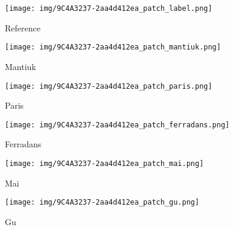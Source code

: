 \documentclass[journal]{IEEEtran}
\begin{document}
\begin{figure*}[t]
        \centering
        \begin{subfigure}[b]{0.24\textwidth}  
            \centering 
            \texttt{[image: img/9C4A3237-2aa4d412ea\_patch\_label.png]}
            \caption[]%
            {{\small Reference }}    
            \label{fig:mean and std of net24}
        \end{subfigure}
        \begin{subfigure}[b]{0.24\textwidth}  
            \centering 
            \texttt{[image: img/9C4A3237-2aa4d412ea\_patch\_mantiuk.png]}
            \caption[]%
            {{\small Mantiuk \cite{mantiuk2008display} }}    
            \label{fig:mean and std of net24}
        \end{subfigure}
        \begin{subfigure}[b]{0.24\textwidth}   
            \centering 
            \texttt{[image: img/9C4A3237-2aa4d412ea\_patch\_paris.png]}
            \caption[]%
            {{\small Paris \cite{paris2015local} }}    
            \label{fig:mean and std of net34}
        \end{subfigure}
        \begin{subfigure}[b]{0.24\textwidth}   
            \centering 
            \texttt{[image: img/9C4A3237-2aa4d412ea\_patch\_ferradans.png]}
            \caption[]%
            {{\small Ferradans \cite{ferradans2011analysis}     }}    
            \label{fig:mean and std of net44}
        \end{subfigure}
        \label{fig:mean and std of nets}
        \centering
        \begin{subfigure}[b]{0.24\textwidth}
            \centering
            \texttt{[image: img/9C4A3237-2aa4d412ea\_patch\_mai.png]}
            \caption[]%
            {{\small Mai \cite{mai2011optimizing} }}    
            \label{fig:mean and std of net14}
        \end{subfigure}
        \begin{subfigure}[b]{0.24\textwidth}
            \centering
            \texttt{[image: img/9C4A3237-2aa4d412ea\_patch\_gu.png]}
            \caption[]%
            {{\small Gu \cite{gu2013local} }}    
            \label{fig:mean and std of net14}

\end{subfigure}
\end{figure*}
\end{document}

